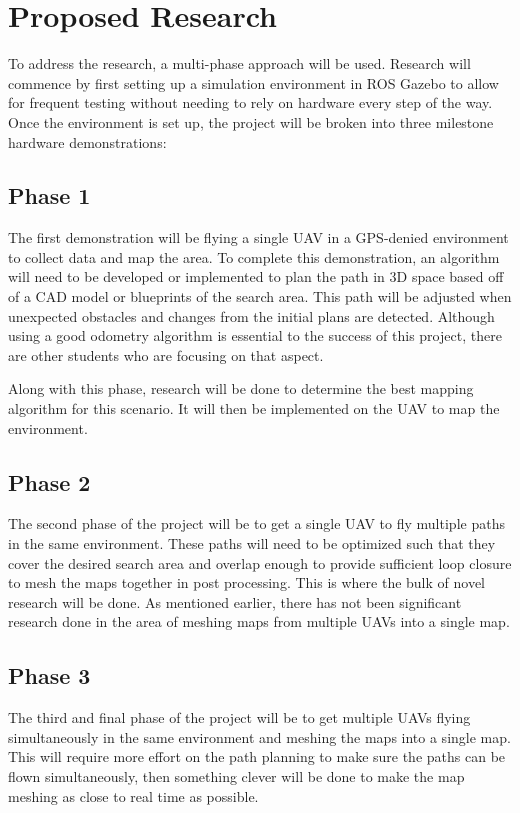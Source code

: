 \documentclass[12pt, letterpaper]{article}
\begin{document}
\section{Proposed Research}

To address the research, a multi-phase approach will be used. Research will commence by first setting up a simulation environment in ROS Gazebo to allow for frequent testing without needing to rely on hardware every step of the way. Once the environment is set up, the project will be broken into three milestone hardware demonstrations: 

\subsection{Phase 1}
The first demonstration will be flying a single UAV in a GPS-denied environment to collect data and map the area. To complete this demonstration, an algorithm will need to be developed or implemented to plan the path in 3D space based off of a CAD model or blueprints of the search area. This path will be adjusted when unexpected obstacles and changes from the initial plans are detected. Although using a good odometry algorithm is essential to the success of this project, there are other students who are focusing on that aspect. 

Along with this phase, research will be done to determine the best mapping algorithm for this scenario. It will then be implemented on the UAV to map the environment. 

\subsection{Phase 2}
The second phase of the project will be to get a single UAV to fly multiple paths in the same environment. These paths will need to be optimized such that they cover the desired search area and overlap enough to provide sufficient loop closure to mesh the maps together in post processing. This is where the bulk of novel research will be done. As mentioned earlier, there has not been significant research done in the area of meshing maps from multiple UAVs into a single map. 

\subsection{Phase 3}
The third and final phase of the project will be to get multiple UAVs flying simultaneously in the same environment and meshing the maps into a single map. This will require more effort on the path planning to make sure the paths can be flown simultaneously, then something clever will be done to make the map meshing as close to real time as possible. 
\end{document}
